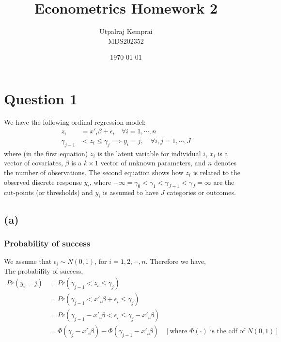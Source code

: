 \documentclass[a4paper]{article}
\begin{document}
\title{Econometrics Homework 2}
\author{Utpalraj Kemprai \\
MDS202352}
\date{\today}

\maketitle

\newpage

\section*{Question 1}

We have the following ordinal regression model:
\begin{align*}
    z_{i} &= x'_{i}\beta + \epsilon_{i} \quad \forall i = 1,\cdots,n \\
    \gamma_{j-1} &< z_{i} \leq \gamma_{j} \implies y_{i} = j, \quad \forall i, j = 1, \cdots, J
\end{align*}
where (in the first equation) $z_i$ is the latent variable for individual $i$, $x_i$ is a  vector of covariates,
$\beta$ is a $k\times1$ vector of unknown parameters, and $n$ denotes the number of observations. The second equation shows how $z_i$ is related to the observed discrete response $y_i$, where $-\infty = \gamma_0 < \gamma_1 <
\gamma_{J-1} < \gamma_J = \infty$ are the cut-points (or thresholds) and $y_i$ is assumed to have $J$ categories or outcomes.

\subsection*{(a)}

\subsubsection*{Probability of success}

We assume that $\epsilon_i \sim N(0,1)$, for $i = 1,2,\cdots, n$. Therefore we have,\\
The probability of success,
\begin{align*}
    Pr(y_i = j) &= Pr(\gamma_{j-1} < z_{i} \leq \gamma_j)\\
                &= Pr(\gamma_{j-1} < x'_{i}\beta + \epsilon_{i} \leq \gamma_j) \\
                &= Pr(\gamma_{j-1} - x'_{i}\beta < \epsilon_{i} \leq \gamma_j - x'_{i}\beta)\\
                &= \Phi(\gamma_j - x'_{i}\beta) - \Phi(\gamma_{j-1} - x'_{i}\beta) &[\text{where } \Phi(\cdot) \text{ is the cdf of }N(0,1) ]
\end{align*}
\end{document}
